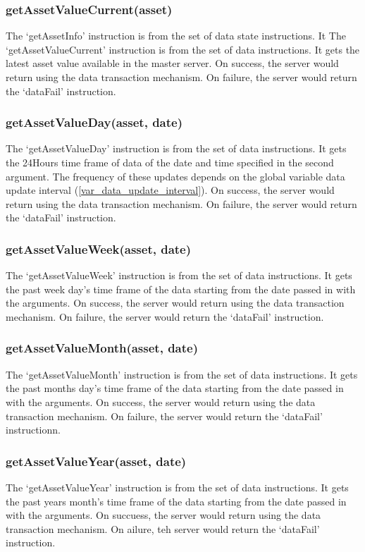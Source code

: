 \documentclass[a4paper]{article}
\begin{document}
\subsubsection{getAssetValueCurrent(asset)}
\label{protocol_inst_getassetvaluecurrent}
The `getAssetInfo' instruction is from the set of data state instructions. It
The `getAssetValueCurrent' instruction is from the set of data instructions. It
gets the latest asset value available in the master server. On success, the
server would return using the data transaction mechanism. On failure, the
server would return the `dataFail' instruction.

\subsubsection{getAssetValueDay(asset, date)}
\label{protocol_inst_getassetvalueday}
The `getAssetValueDay' instruction is from the set of data instructions. It
gets the 24Hours time frame of data of the date and time specified in the
second argument. The frequency of these updates depends on the global variable
data update interval (\ref{var_data_update_interval}). On success, the server
would return using the data transaction mechanism. On failure, the server would
return the `dataFail' instruction.

\subsubsection{getAssetValueWeek(asset, date)}
\label{protocol_inst_getassetvalueweek}
The `getAssetValueWeek' instruction is from the set of data instructions. It
gets the past week day's time frame of the data starting from the date passed 
in with the arguments. On success, the server would return using the data 
transaction mechanism. On failure, the server would return the `dataFail' 
instruction.

\subsubsection{getAssetValueMonth(asset, date)}
\label{protocol_inst_getassetvaluemonth}
The `getAssetValueMonth' instruction is from the set of data instructions. It
gets the past months day's time frame of the data starting from the date passed
in with the arguments. On success, the server would return using the data
transaction mechanism. On failure, the server would return the `dataFail'
instructionn.

\subsubsection{getAssetValueYear(asset, date)}
\label{protocol_inst_getassetvalueyear}
The `getAssetValueYear' instruction is from the set of data instructions. It
gets the past years month's time frame of the data starting from the date
passed in with the arguments. On succuess, the server would return using the
data transaction mechanism. On ailure, teh server would return the `dataFail'
instruction.
\end{document}
